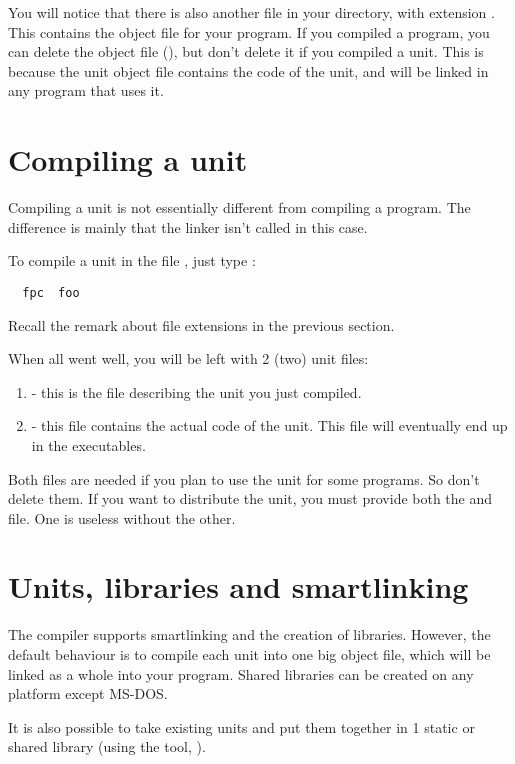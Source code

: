 You will notice that there is also another file in your directory, with
extension . This contains the object file for your program.
If you compiled a program, you can delete the object file (),
but don't delete it if you compiled a unit. This is because
the unit object file contains the code of the unit, and will be
linked in any program that uses it.



\section{Compiling a unit}

Compiling a unit is not essentially different from compiling a program.
The difference is mainly that the linker isn't called in this case.

To compile a unit in the file , just type :
\begin{verbatim}
  fpc  foo
\end{verbatim}
Recall the remark about file extensions in the previous section.

When all went well, you will be left with 2 (two) unit files:
\begin{enumerate}
\item {} - this is the file describing the unit you just
compiled.
\item {} - this file contains the actual code of the unit.
This file will eventually end up in the executables.
\end{enumerate}
Both files are needed if you plan to use the unit for some programs.
So don't delete them. If you want to distribute the unit, you must
provide both the  and  file. One is useless without the
other.

\section{Units, libraries and smartlinking}
The \fpc compiler supports smartlinking and the creation of libraries.
However, the default behaviour is to compile each unit into one big object
file, which will be linked as a whole into your program.
Shared libraries can be created on any platform except MS-DOS.

It is also possible to take existing units and put them
together in 1 static or shared library (using the  tool,
).


